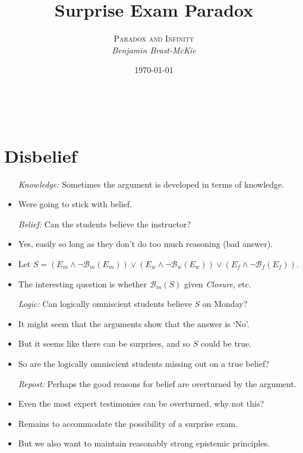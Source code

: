 \documentclass[a4paper, 11pt]{article} %
\title{\textbf{Surprise Exam Paradox}} %
\author{\textsc{Paradox and Infinity}\\ \em Benjamin Brast-McKie} %
\date{\today} %
\makeatletter
\newcommand{\B}{\mathcal{B}}
\newcommand{\B}{\mathfrak{B}}
\renewcommand{\maketitle}{ %
\begin{flushright} %
{\LARGE\@title} %

\vspace{10pt} %

{\@author} %
\\\@date %

\vspace{-30pt} %
\end{flushright}
}
\makeatother
\begin{document}
\maketitle %

\thispagestyle{empty}


\section*{Disbelief}

\begin{itemize}
  \item[\it Knowledge:] Sometimes the argument is developed in terms of knowledge.
    \item Were going to stick with belief.
  \item[\it Belief:] Can the students believe the instructor?
    \item Yes, easily so long as they don't do too much reasoning (bad answer).
    \item Let $S = (E_m \wedge \neg \B_m(E_m)) \vee (E_w \wedge \neg \B_w(E_w)) \vee (E_f \wedge \neg \B_f(E_f))$.
    \item The interesting question is whether $\B_m(S)$ given \textit{Closure}, etc. 
  \item[\it Logic:] Can logically omniscient students believe $S$ on Monday?
    \item It might seem that the arguments show that the answer is `No'. 
    \item But it seems like there can be surprises, and so $S$ could be true. 
    \item So are the logically omniscient students missing out on a true belief?
  \item[\it Repost:] Perhaps the good reasons for belief are overturned by the argument.
    \item Even the most expert testimonies can be overturned, why not this?
    \item Remains to accommodate the possibility of a surprise exam.
    \item But we also want to maintain reasonably strong epistemic principles.
\end{itemize}
\end{document}
